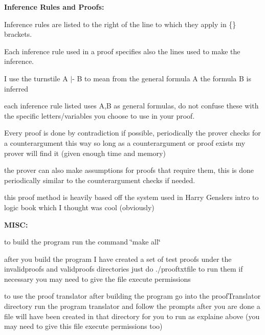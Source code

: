 {\bfseries Inference Rules and Proofs\+:} 
\begin{DoxyItemize}
\item Inference rules are listed to the right of the line to which they apply in \textquotesingle{}\{\}\textquotesingle{} brackets. 
\item Each inference rule used in a proof specifies also the lines used to make the inference. 
\item I use the turnstile \textquotesingle{}A $\vert$-\/ B\textquotesingle{} to mean from the general formula A the formula B is inferred 
\item each inference rule listed uses A,B as general formulas, do not confuse these with the specific letters/variables you choose to use in your proof. 
\item Every proof is done by contradiction if possible, periodically the prover checks for a counterargument this way so long as a counterargument or proof exists my prover will find it (given enough time and memory) 
\item the prover can also make assumptions for proofs that require them, this is done periodically similar to the counterargument checks if needed. 
\item this proof method is heavily based off the system used in Harry Genslers intro to logic book which I thought was cool (obviously) 
\end{DoxyItemize}

{\bfseries M\+I\+SC\+:} 
\begin{DoxyItemize}
\item to build the program run the command \char`\"{}make all\char`\"{} 
\item after you build the program I have created a set of test proofs under the invalidproofs and validproofs directories just do ./prooftxtfile to run them if necessary you may need to give the file execute permissions 
\item to use the proof translator after building the program go into the proof\+Translator directory run the program translator and follow the prompts after you are done a file will have been created in that directory for you to run as explaine above (you may need to give this file execute permissions too) 
\end{DoxyItemize}